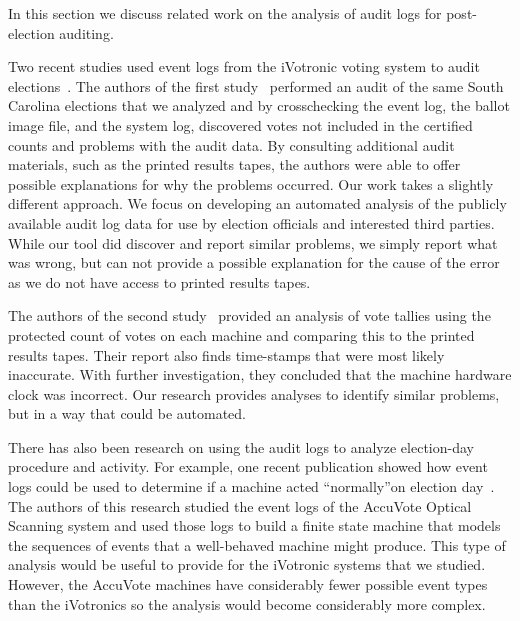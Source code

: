 In this section we discuss related work on the analysis of audit logs for
post-election auditing.  

Two recent studies used event logs from the iVotronic voting system to audit
elections~\cite{Buell2011,Sandler2007}. The authors of the first
study~\cite{Buell2011} performed an audit of the same South Carolina elections
that we analyzed and by crosschecking the event log, the ballot image file, and
the system log, discovered votes not included in
the certified counts and problems with the audit data. By consulting additional audit materials, such as
the printed results tapes, the authors were able to offer possible 
explanations for why the problems occurred. Our work takes a slightly
different approach.  We focus on developing an automated analysis of the
publicly available audit log data for
use by election officials and interested third parties.  While our tool did
discover and report similar problems, we simply report what was wrong, but can
not provide a possible explanation for the cause of the error as we do not have
access to printed results tapes.  

The authors of the second study~\cite{Sandler2007} provided an analysis of vote tallies using the protected count of votes on each machine and comparing this to the printed results tapes. Their report also finds time-stamps that were most likely inaccurate.  With further investigation, they concluded that the machine hardware clock was incorrect. Our research provides analyses to identify similar problems, but in a way that could be automated. 

There has also been research on using the audit logs to analyze election-day procedure and activity. For example, one recent publication showed how event logs could be used to determine if a machine acted \textquotedblleft normally\textquotedblright on election day~\cite{Antonyan2009}. The authors of this research studied the event logs of the AccuVote Optical Scanning system and used those logs to build a finite state machine that models the sequences of events that a well-behaved machine might produce. This type of analysis would be useful to provide for the iVotronic systems that we studied. However, the AccuVote machines have considerably fewer possible event types than the iVotronics so the analysis would become considerably more complex. 

